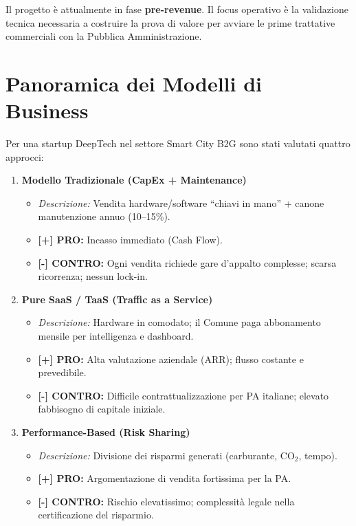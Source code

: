 \documentclass[a4paper,11pt]{article}
\newcommand{\pro}[1]{\textcolor{SmartGreen}{\textbf{[+] PRO:} #1}}
\newcommand{\contro}[1]{\textcolor{SmartRed}{\textbf{[-] CONTRO:} #1}}
\begin{document}
\vspace{0.3cm}
Il progetto è attualmente in fase \textbf{pre-revenue}. Il focus operativo è la
validazione tecnica necessaria a costruire la prova di valore per avviare
le prime trattative commerciali con la Pubblica Amministrazione.

\section{Panoramica dei Modelli di Business}

Per una startup DeepTech nel settore Smart City B2G sono stati valutati quattro approcci:

\begin{enumerate}[label=\textbf{\arabic*.}, leftmargin=*, itemsep=1em]

    \item \textbf{Modello Tradizionale (CapEx + Maintenance)}
    \begin{itemize}[label=, leftmargin=1em, nosep]
        \item \textit{Descrizione:} Vendita hardware/software ``chiavi in mano'' + canone manutenzione annuo (10--15\%).
        \item \pro{Incasso immediato (Cash Flow).}
        \item \contro{Ogni vendita richiede gare d'appalto complesse; scarsa ricorrenza; nessun lock-in.}
    \end{itemize}

    \item \textbf{Pure SaaS / TaaS (Traffic as a Service)}
    \begin{itemize}[label=, leftmargin=1em, nosep]
        \item \textit{Descrizione:} Hardware in comodato; il Comune paga abbonamento mensile per intelligenza e dashboard.
        \item \pro{Alta valutazione aziendale (ARR); flusso costante e prevedibile.}
        \item \contro{Difficile contrattualizzazione per PA italiane; elevato fabbisogno di capitale iniziale.}
    \end{itemize}

    \item \textbf{Performance-Based (Risk Sharing)}
    \begin{itemize}[label=, leftmargin=1em, nosep]
        \item \textit{Descrizione:} Divisione dei risparmi generati (carburante, CO$_2$, tempo).
        \item \pro{Argomentazione di vendita fortissima per la PA.}
        \item \contro{Rischio elevatissimo; complessità legale nella certificazione del risparmio.}
    \end{itemize}


\end{enumerate}
\end{document}
